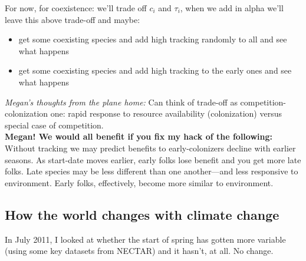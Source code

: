 \documentclass[11pt,a4paper,oneside]{article}
\begin{document}
\noindent For now, for coexistence: we'll trade off \(c_{i}\) and \(\tau_{i}\), when we add in alpha we'll leave this above trade-off and maybe:
\begin{itemize}
\item get some coexisting species and add high tracking randomly to all and see what happens
\item get some coexisting species and add high tracking to the early ones and see what happens
\end{itemize}

\noindent \emph{Megan's thoughts from the plane home:} Can think of trade-off as competition-colonization one: rapid response to resource availability (colonization) versus special case of competition.\\
{\bf Megan! We would all benefit if you fix my hack of the following:} Without tracking we may predict benefits to early-colonizers decline with earlier seasons. As start-date moves earlier, early folks lose benefit and you get more late folks. Late species may be less different than one another---and less responsive to environment. Early folks, effectively, become more similar to environment. 

\subsection{How the world changes with climate change}

\noindent In July 2011, I looked at whether the start of spring
has gotten more variable (using some key datasets from NECTAR) and it
hasn't, at all. No change.\\
\end{document}

